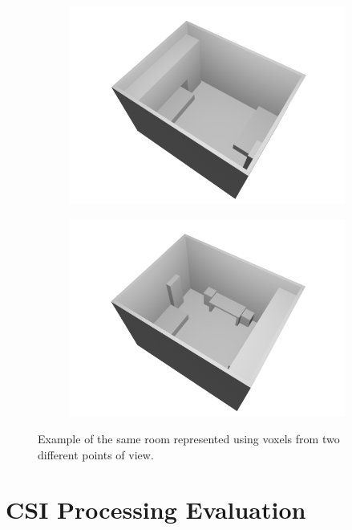 \documentclass[binding=0.6cm,noexaminfo]{sapthesis}
\begin{document}
\begin{figure}[h!]
\centering
\begin{subfigure}{.49\textwidth}
	\centering
	\includegraphics[width=\linewidth]{3d-example-1}
\end{subfigure}
\begin{subfigure}{.49\textwidth}
	\centering
	\includegraphics[width=\linewidth]{3d-example-2}
\end{subfigure}
\caption{Example of the same room represented using voxels from two different points of view.}
\label{fig:room-example}
\end{figure}

\section{CSI Processing Evaluation}\label{sec:csi-eval}
\end{document}
